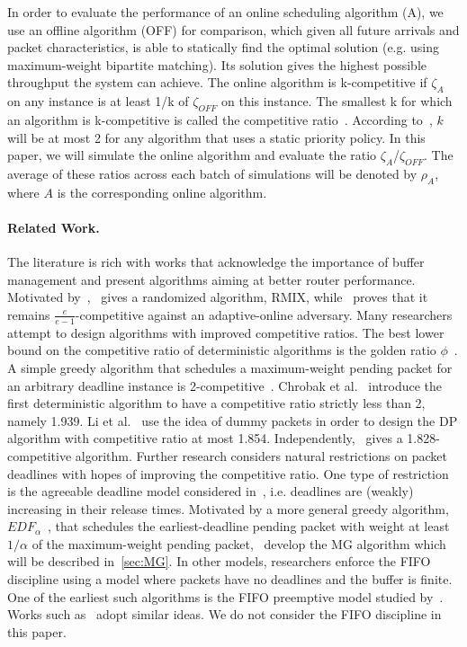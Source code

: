 \documentclass[oribibl]{llncs}
\begin{document}
In order to evaluate the performance of an online scheduling algorithm
(A), we use an offline algorithm (OFF) for comparison, which given all
future arrivals and packet characteristics, is able to statically find
the optimal solution (e.g. using maximum-weight bipartite
matching). Its solution gives the highest possible throughput the
system can achieve. The online algorithm is k-competitive if
$\zeta_{A}$ on any instance is at least 1/k of $\zeta_{OFF}$ on this
instance. The smallest k for which an algorithm is k-competitive is
called the competitive ratio~\cite{borodin98}. According
to~\cite{hajek01}, $k$ will be at most 2 for any algorithm that uses a
static priority policy. In this paper, we will simulate the online
algorithm and evaluate the ratio $\zeta_{A}$/$\zeta_{OFF}$. The
average of these ratios across each batch of simulations will be
denoted by $\rho_A$, where $A$ is the corresponding online algorithm.


\paragraph {Related Work.} The literature is rich with works that
acknowledge the importance of buffer management and present algorithms aiming at better router performance. Motivated by~\cite{kesselman04},~\cite{chin06}
gives a randomized algorithm, RMIX, while~\cite{bienkowski08} proves that it remains
$\frac{e}{e-1}$-competitive against an adaptive-online
adversary. Many researchers attempt to design algorithms
with improved competitive ratios. The best lower bound on the
competitive ratio of deterministic algorithms is the golden ratio
$\phi$~\cite{hajek01,chin03}. A simple greedy algorithm that schedules
a maximum-weight pending packet for an arbitrary deadline instance is 2-competitive~\cite{hajek01,kesselman04}. Chrobak et al.~\cite{chrobak04} introduce the first deterministic algorithm to have a competitive ratio strictly less than 2, namely 1.939. Li et al.~\cite{li07} use the idea of dummy packets in order to design the DP algorithm with competitive ratio at most 1.854. Independently,~\cite{englert07} gives a 1.828-competitive algorithm. Further research considers natural restrictions on packet deadlines with hopes of improving the competitive ratio. One type of restriction is the agreeable deadline model considered
in~\cite{jez12}, i.e. deadlines are (weakly) increasing in their
release times. Motivated by a more general
greedy algorithm, $EDF_\alpha$~\cite{chin06}, that schedules the earliest-deadline
pending packet with weight at least $1/\alpha$ of the maximum-weight
pending packet,~\cite{jez12}  develop the MG algorithm
which will be described in~\ref{sec:MG}. In other models, researchers enforce the FIFO discipline using a model where packets have no deadlines and the buffer is finite. One of the earliest such algorithms is the FIFO preemptive model studied by~\cite{andelman03}. Works such as~\cite{englert06,kesselman05,lotker02} adopt similar ideas. We do not consider the FIFO discipline in this paper.
\end{document}
